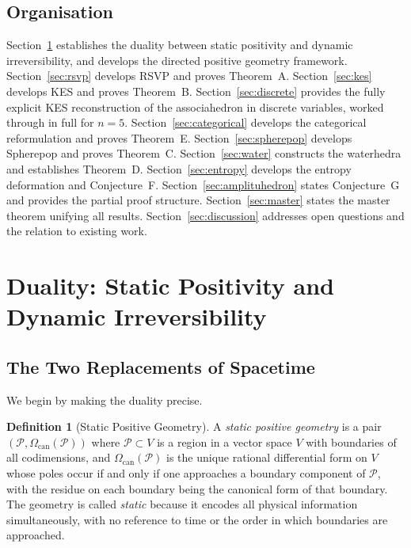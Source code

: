 \documentclass[12pt, oneside]{amsart}
\theoremstyle{plain}
\theoremstyle{definition}
\newtheorem{definition}[theorem]{Definition}
\theoremstyle{remark}
\newcommand{\CF}{\Omega_{\mathrm{can}}}
\begin{document}
\subsection{Organisation}

Section~\ref{sec:duality} establishes the duality between static positivity and dynamic irreversibility, and develops the directed positive geometry framework. Section~\ref{sec:rsvp} develops RSVP and proves Theorem~A. Section~\ref{sec:kes} develops KES and proves Theorem~B. Section~\ref{sec:discrete} provides the fully explicit KES reconstruction of the associahedron in discrete variables, worked through in full for $n=5$. Section~\ref{sec:categorical} develops the categorical reformulation and proves Theorem~E. Section~\ref{sec:spherepop} develops Spherepop and proves Theorem~C. Section~\ref{sec:water} constructs the waterhedra and establishes Theorem~D. Section~\ref{sec:entropy} develops the entropy deformation and Conjecture~F. Section~\ref{sec:amplituhedron} states Conjecture~G and provides the partial proof structure. Section~\ref{sec:master} states the master theorem unifying all results. Section~\ref{sec:discussion} addresses open questions and the relation to existing work.

\section{Duality: Static Positivity and Dynamic Irreversibility}
\label{sec:duality}

\subsection{The Two Replacements of Spacetime}

We begin by making the duality precise.

\begin{definition}[Static Positive Geometry]
\label{def:static-pg}
A \emph{static positive geometry} is a pair $(\mathcal{P}, \CF(\mathcal{P}))$ where $\mathcal{P} \subset V$ is a region in a vector space $V$ with boundaries of all codimensions, and $\CF(\mathcal{P})$ is the unique rational differential form on $V$ whose poles occur if and only if one approaches a boundary component of $\mathcal{P}$, with the residue on each boundary being the canonical form of that boundary. The geometry is called \emph{static} because it encodes all physical information simultaneously, with no reference to time or the order in which boundaries are approached.
\end{definition}
\end{document}
